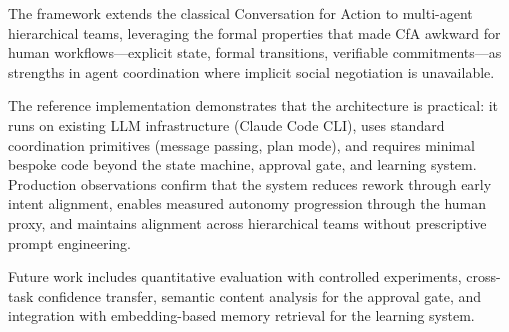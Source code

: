 \documentclass[11pt,a4paper]{article}
\begin{document}
The framework extends the classical Conversation for Action to
multi-agent hierarchical teams, leveraging the formal properties
that made CfA awkward for human workflows---explicit state, formal
transitions, verifiable commitments---as strengths in agent
coordination where implicit social negotiation is unavailable.

The reference implementation demonstrates that the architecture is
practical: it runs on existing LLM infrastructure (Claude Code CLI),
uses standard coordination primitives (message passing, plan mode),
and requires minimal bespoke code beyond the state machine, approval
gate, and learning system. Production observations confirm that
the system reduces rework through early intent alignment, enables
measured autonomy progression through the human proxy, and maintains
alignment across hierarchical teams without prescriptive prompt
engineering.

Future work includes quantitative evaluation with controlled
experiments, cross-task confidence transfer, semantic content analysis
for the approval gate, and integration with embedding-based memory
retrieval for the learning system.


\end{document}
